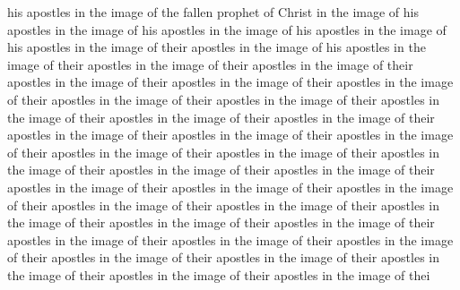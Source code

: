 \documentclass{article}
\begin{document}
his apostles in the image of the fallen prophet of Christ in the image of his apostles in the image of his apostles in the image of his apostles in the image of his apostles in the image of their apostles in the image of his apostles in the image of their apostles in the image of their apostles in the image of their apostles in the image of their apostles in the image of their apostles in the image of their apostles in the image of their apostles in the image of their apostles in the image of their apostles in the image of their apostles in the image of their apostles in the image of their apostles in the image of their apostles in the image of their apostles in the image of their apostles in the image of their apostles in the image of their apostles in the image of their apostles in the image of their apostles in the image of their apostles in the image of their apostles in the image of their apostles in the image of their apostles in the image of their apostles in the image of their apostles in the image of their apostles in the image of their apostles in the image of their apostles in the image of their apostles in the image of their apostles in the image of their apostles in the image of their apostles in the image of their apostles in the image of their apostles in the image of thei
\end{document}
